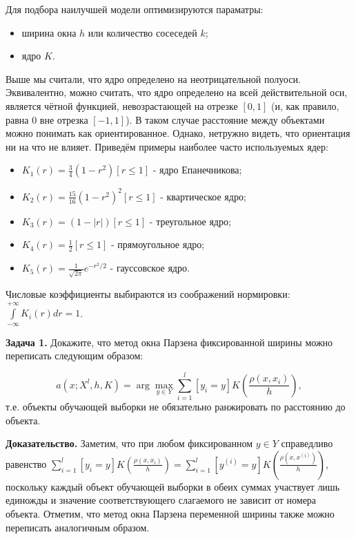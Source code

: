 Для подбора наилучшей модели оптимизируются параматры:
\begin{itemize}
    \item ширина окна $h$ или количество сосеседей $k$;
    \item ядро $K$.
\end{itemize}

Выше мы считали, что ядро определено на неотрицательной полуоси. Эквивалентно, можно считать, что ядро определено на всей действительной оси, является чётной функцией, невозрастающей на отрезке $[0,1]$ (и, как правило, равна $0$ вне отрезка $[-1,1]$). В таком случае расстояние между объектами можно понимать как ориентированное. Однако, нетружно видеть, что ориентация ни на что не влияет. Приведём примеры наиболее часто используемых ядер:
\begin{itemize}
    \item $\displaystyle K_1(r) = \frac{3}{4}(1-r^2)[r\le1]$ - ядро Епанечникова;
    \item $\displaystyle K_2(r) = \frac{15}{16}(1-r^2)^2[r\le1]$ - квартическое ядро;
    \item $\displaystyle K_3(r) = (1-|r|)[r\le1]$ - треугольное ядро; 
    \item $\displaystyle K_4(r) = \frac{1}{2}[r\le1]$ - прямоугольное ядро; \item $\displaystyle K_5(r) = \frac{1}{\sqrt{2\pi}}e^{-r^2/2}$ - гауссовское ядро.
\end{itemize}
Числовые коэффициенты выбираются из соображений нормировки: $\displaystyle\int\limits_{-\infty}^{+\infty} K_i(r)dr = 1$.

\textbf{Задача 1.} Докажите, что метод окна Парзена фиксированной ширины можно переписать следующим образом:

\begin{equation*}
    \displaystyle a(x; X^l, h, K) = \arg\max_{y\in Y} \sum\limits_{i=1}^l[y_i=y]K\left(\frac{\rho(x, x_i)}{h}\right),
\end{equation*}
т.е. объекты обучающей выборки не обязательно ранжировать по расстоянию до объекта.

\textbf{Доказательство.} Заметим, что при любом фиксированном $y\in Y$ справедливо равенство $\displaystyle\sum\limits_{i=1}^l[y_i=y]K\left(\frac{\rho(x, x_i)}{h}\right) = \sum\limits_{i=1}^l[y^{(i)}=y]K\left(\frac{\rho(x, x^{(i)})}{h}\right)$, поскольку каждый объект обучающей выборки в обеих суммах участвует лишь единожды и значение соответствующего слагаемого не зависит от номера объекта. Отметим, что метод окна Парзена переменной ширины также можно переписать аналогичным образом.
\\

